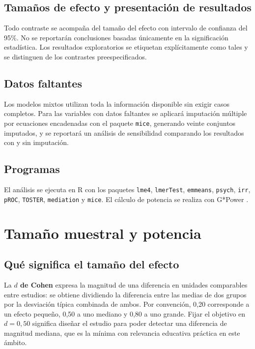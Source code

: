 \documentclass[12pt,a4paper,openany]{report}
\begin{document}
    \section{Tama\~nos de efecto y presentaci\'on de resultados}
    
    Todo contraste se acompa\~na del tama\~no del efecto con intervalo de confianza del 95\%. No se reportar\'an conclusiones basadas \'unicamente en la significaci\'on estad\'istica. Los resultados exploratorios se etiquetan expl\'icitamente como tales y se distinguen de los contrastes preespecificados.
    
    \section{Datos faltantes}
    
    Los modelos mixtos utilizan toda la informaci\'on disponible sin exigir casos completos. Para las variables con datos faltantes se aplicar\'a imputaci\'on m\'ultiple por ecuaciones encadenadas con el paquete \texttt{mice}, generando veinte conjuntos imputados, y se reportar\'a un an\'alisis de sensibilidad comparando los resultados con y sin imputaci\'on.
    
    \section{Programas}
    
    El an\'alisis se ejecuta en R con los paquetes \texttt{lme4}, \texttt{lmerTest}, \texttt{emmeans}, \texttt{psych}, \texttt{irr}, \texttt{pROC}, \texttt{TOSTER}, \texttt{mediation} y \texttt{mice}. El c\'alculo de potencia se realiza con G*Power \citep{faul2007gpower}.
    
    \chapter{Tama\~no muestral y potencia}
    \label{cap:potencia}
    
    \section{Qu\'e significa el tama\~no del efecto}
    
    La \textbf{$d$ de Cohen} expresa la magnitud de una diferencia en unidades comparables entre estudios: se obtiene dividiendo la diferencia entre las medias de dos grupos por la desviaci\'on t\'ipica combinada de ambos. Por convenci\'on, 0{,}20 corresponde a un efecto peque\~no, 0{,}50 a uno mediano y 0{,}80 a uno grande. Fijar el objetivo en $d = 0{,}50$ significa dise\~nar el estudio para poder detectar una diferencia de magnitud mediana, que es la m\'inima con relevancia educativa pr\'actica en este \'ambito.
    
\end{document}
